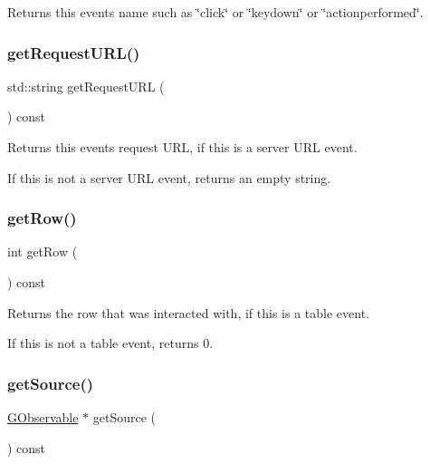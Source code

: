 Returns this event\textquotesingle{}s name such as \char`\"{}click\char`\"{} or \char`\"{}keydown\char`\"{} or \char`\"{}actionperformed\char`\"{}. 

\mbox{\label{classsgl_1_1GEvent_add17fc1a534941f382f2fc7970269138}} 
\subsubsection{\texorpdfstring{get\+Request\+U\+R\+L()}{getRequestURL()}}
{\footnotesize\ttfamily std\+::string get\+Request\+U\+RL (\begin{DoxyParamCaption}{ }\end{DoxyParamCaption}) const\hspace{0.3cm}{\ttfamily [virtual]}}



Returns this event\textquotesingle{}s request U\+RL, if this is a server U\+RL event. 

If this is not a server U\+RL event, returns an empty string. \mbox{\label{classsgl_1_1GEvent_aa7d942808111bd8f4a3ec1cfcf33c6af}} 
\subsubsection{\texorpdfstring{get\+Row()}{getRow()}}
{\footnotesize\ttfamily int get\+Row (\begin{DoxyParamCaption}{ }\end{DoxyParamCaption}) const\hspace{0.3cm}{\ttfamily [virtual]}}



Returns the row that was interacted with, if this is a table event. 

If this is not a table event, returns 0. \mbox{\label{classsgl_1_1GEvent_a6a534b750e8678439ebfbeda4b2e4b26}} 
\subsubsection{\texorpdfstring{get\+Source()}{getSource()}}
{\footnotesize\ttfamily \mbox{\hyperlink{classsgl_1_1GObservable}{G\+Observable}} $\ast$ get\+Source (\begin{DoxyParamCaption}{ }\end{DoxyParamCaption}) const\hspace{0.3cm}{\ttfamily [virtual]}}



